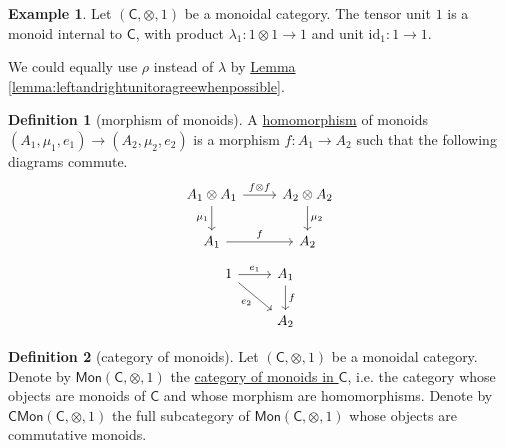 \documentclass[a4paper,10pt]{scrreprt}
\newcommand{\defn}[1]{\ul{#1}}
\theoremstyle{definition}
\newtheorem{definition}{Definition}[section]
\newtheorem{example}{Example}[section]
\theoremstyle{plain}
\theoremstyle{remark}
\begin{document}
\begin{example}
  \label{eg:tensorunitisinternalmonoid}
  Let $(\mathsf{C}, \otimes, 1)$ be a monoidal category. The tensor unit $1$ is a monoid internal to $\mathsf{C}$, with product $\lambda_{1}\colon 1 \otimes 1 \to 1$ and unit $\mathrm{id}_{1}\colon 1 \to 1$.

  We could equally use $\rho$ instead of $\lambda$ by \hyperref[lemma:leftandrightunitoragreewhenpossible]{Lemma \ref*{lemma:leftandrightunitoragreewhenpossible}}.
\end{example}

\begin{definition}[morphism of monoids]
  \label{def:homomorphismofmonoids}
  A \defn{homomorphism} of monoids $(A_{1}, \mu_{1}, e_{1}) \to (A_{2}, \mu_{2}, e_{2})$ is a morphism $f\colon A_{1} \to A_{2}$ such that the following diagrams commute.
  \begin{equation*}
    \begin{tikzcd}
      A_{1} \otimes A_{1}
      \arrow[r, "f \otimes f"]
      \arrow[d, swap, "\mu_{1}"]
      & A_{2} \otimes A_{2}
      \arrow[d, "\mu_{2}"]
      \\
      A_{1} 
      \arrow[r, "f"]
      & A_{2}
    \end{tikzcd}
  \end{equation*}
  \begin{equation*}
    \begin{tikzcd}
      1
      \arrow[r, "e_{1}"]
      \arrow[rd, swap, "e_{2}"]
      & A_{1}
      \arrow[d, "f"]
      \\
      & A_{2}
    \end{tikzcd}
  \end{equation*}
\end{definition}

\begin{definition}[category of monoids]
  \label{def:categoryofmonoids}
  Let $(\mathsf{C}, \otimes, 1)$ be a monoidal category. Denote by $\mathsf{Mon}(\mathsf{C}, \otimes, 1)$ the \defn{category of monoids in $\mathsf{C}$}, i.e. the category whose objects are monoids of $\mathsf{C}$ and whose morphism are homomorphisms. Denote by $\mathsf{CMon}(\mathsf{C}, \otimes, 1)$ the full subcategory of $\mathsf{Mon}(\mathsf{C}, \otimes, 1)$ whose objects are commutative monoids.
\end{definition}
\end{document}
